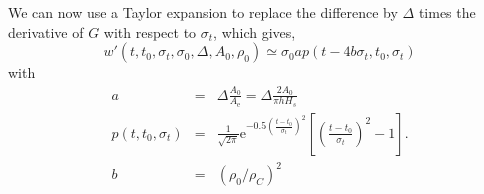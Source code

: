We can now use a Taylor expansion to replace the difference by $\Delta$ times the derivative of $G$ with respect to $\sigma_t$, which gives, 
\begin{equation}
   w'(t,t_0,\sigma_t,\sigma_0,\Delta, A_0,\rho_0) \simeq   \sigma_0 a p(t- 4 b \sigma_t,t_0,\sigma_t)
\end{equation} 
with 
\begin{eqnarray}
        a&=&\Delta \frac{A_0}{A_{\mathrm{e}}}  =\Delta \frac{2 A_0}{\pi h H_s} \label{eq:alti_a} \\ 
    p(t,t_0,\sigma_t) &=& \frac{1}{\sqrt{2\pi}} \mathrm{e}^{-0.5 \left(\frac{t-t_0}{\sigma_t} \right)^2 } \left[\left(\frac{t-t_0}{\sigma_t} \right)^2-1\right]. \label{eq:p_alti} \\
        b&=& \left(\rho_0/\rho_C \right)^2
\end{eqnarray} 


